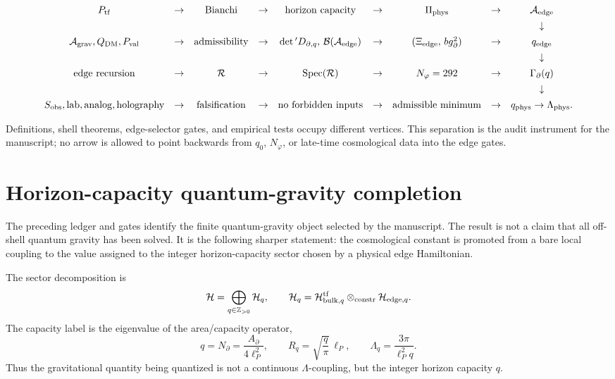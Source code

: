 \documentclass[aps,prd,reprint,nofootinbib,superscriptaddress,floatfix]{revtex4-2}
\numberwithin{equation}{section}
\theoremstyle{definition}
\theoremstyle{plain}
\begin{document}
\begin{widetext}
\[
\begin{array}{ccccccccc}
P_{\rm tf}
&\to&
{\rm Bianchi}
&\to&
{\rm horizon\ capacity}
&\to&
\Pi_{\rm phys}
&\to&
\mathcal A_{\rm edge}
\\[4pt]
&&&&&&&& \downarrow
\\[4pt]
\mathcal A_{\rm grav},Q_{\rm DM},P_{\rm val}
&\to&
{\rm admissibility}
&\to&
\det{}'D_{\partial,q},\,\mathcal B(\mathcal A_{\rm edge})
&\to&
(\Xi_{\rm edge},\,b g_\partial^2)
&\to&
q_{\rm edge}
\\[4pt]
&&&&&&&& \downarrow
\\[4pt]
{\rm edge\ recursion}
&\to&
\mathcal R
&\to&
\operatorname{Spec}(\mathcal R)
&\to&
N_\varphi=292
&\to&
\Gamma_\partial(q)
\\[4pt]
&&&&&&&& \downarrow
\\[4pt]
S_{\rm obs},{\rm lab},{\rm analog},{\rm holography}
&\to&
{\rm falsification}
&\to&
{\rm no\ forbidden\ inputs}
&\to&
{\rm admissible\ minimum}
&\to&
q_{\rm phys}\to\Lambda_{\rm phys}.
\end{array}
\]
\end{widetext}
Definitions, shell theorems, edge-selector gates, and empirical tests occupy
different vertices.  This separation is the audit instrument for the
manuscript; no arrow is allowed to point backwards from \(q_0\), \(N_\varphi\),
or late-time cosmological data into the edge gates.

\section{Horizon-capacity quantum-gravity completion}
\label{sec:horizon-capacity-qg}

The preceding ledger and gates identify the finite quantum-gravity object
selected by the manuscript.  The result is not a claim that all off-shell
quantum gravity has been solved.  It is the following sharper statement: the
cosmological constant is promoted from a bare local coupling to the value
assigned to the integer horizon-capacity sector chosen by a physical edge
Hamiltonian.

The sector decomposition is
\[
\mathcal H
=
\bigoplus_{q\in\mathbb Z_{>0}}\mathcal H_q,
\qquad
\mathcal H_q
=
\mathcal H_{{\rm bulk},q}^{\rm tf}
\otimes_{\rm constr}
\mathcal H_{{\rm edge},q}.
\]
The capacity label is the eigenvalue of the area/capacity operator,
\[
q=N_\partial=\frac{A_\partial}{4\ell_P^2},
\qquad
R_q=\sqrt{\frac q\pi}\,\ell_P,
\qquad
\Lambda_q=\frac{3\pi}{\ell_P^2q}.
\]
Thus the gravitational quantity being quantized is not a continuous
\(\Lambda\)-coupling, but the integer horizon capacity \(q\).
\end{document}
